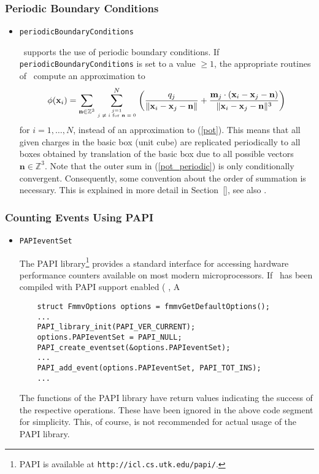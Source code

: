 \subsubsection*{Periodic Boundary Conditions}
\begin{itemize}
    \item\verb|periodicBoundaryConditions|

\fmmv\ supports the use of periodic boundary conditions. 
If \verb|periodicBoundaryConditions| is set to a value
$\geq 1$, the appropriate routines of \fmmv\ compute
an approximation to
\begin{equation}\label{pot_periodic}
	\phi(\mathbf{x}_i) = 
	\sum_{\mathbf{n}\in\mathbb{Z}^3}
	\sum_{j=1\atop \mbox{\tiny$j\neq i$ for $\mathbf{n}=0$}}^N
	\left(
	\frac{q_j}{\Vert\mathbf{x}_i-\mathbf{x}_j-\mathbf{n}\Vert}
	+\frac{\mathbf{m}_j\cdot(\mathbf{x}_i-\mathbf{x}_j-\mathbf{n})}
	      {\Vert\mathbf{x}_i-\mathbf{x}_j-\mathbf{n}\Vert^3}
	\right)
\end{equation}	
for $i=1,\dots,N$, instead of an approximation to (\ref{pot}).
This means that all given charges in the basic box (unit cube) are replicated
periodically to all boxes obtained by translation of the basic box due
to all possible vectors $\mathbf{n}\in\mathbb{Z}^3$.
Note that the outer sum in (\ref{pot_periodic})  is only
conditionally convergent. Consequently,
some convention about the order of summation is
necessary. This is explained in more detail in Section~\ref{}, see also
\cite{periodic}.

\end{itemize}

\subsubsection*{Counting Events Using PAPI}
\begin{itemize}
    \item\verb|PAPIeventSet|

    The PAPI library\footnote{PAPI is available at
    {\tt http://icl.cs.utk.edu/papi/}.}
    provides a standard interface 
    for accessing hardware performance counters available 
    on most modern microprocessors.
    If \fmmv\ has been compiled with PAPI support enabled
    ( , 
    A
    \begin{verbatim}
    struct FmmvOptions options = fmmvGetDefaultOptions();
    ...
    PAPI_library_init(PAPI_VER_CURRENT);
    options.PAPIeventSet = PAPI_NULL;
    PAPI_create_eventset(&options.PAPIeventSet);
    ...
    PAPI_add_event(options.PAPIeventSet, PAPI_TOT_INS);
    ...
    \end{verbatim}
The functions of the PAPI library have  return values indicating the
success of the respective operations. These have been ignored
in the above code segment for simplicity. This, of course, is not
recommended for actual usage of the PAPI library.
\end{itemize}



